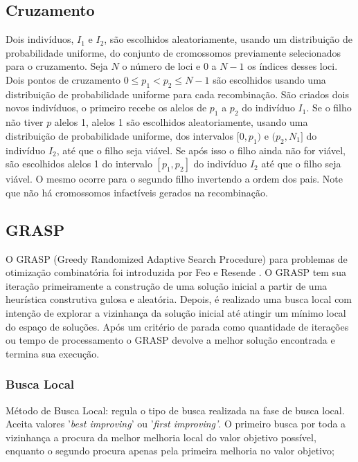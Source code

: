 \documentclass[12pt,a4paper]{article}
\begin{document}
    \subsection{Cruzamento}

        Dois indivíduos, $I_1$ e $I_2$, são escolhidos aleatoriamente, usando um distribuição de probabilidade uniforme, do conjunto de cromossomos previamente selecionados para o cruzamento. Seja
        $N$ o número de loci e $0$ a $N-1$ os índices desses loci. Dois pontos de cruzamento $0 \le p_1 < p_2 \le N-1$ são escolhidos usando uma distribuição de probabilidade uniforme para cada
        recombinação. São criados dois novos indivíduos, o primeiro recebe os alelos de $p_1$ a $p_2$ do indivíduo $I_1$. Se o filho não tiver $p$ alelos 1, alelos 1 são escolhidos aleatoriamente,
        usando uma distribuição de probabilidade uniforme, dos intervalos $[0, p_1)$ e $(p_2, N_1]$ do indivíduo $I_2$, até que o filho seja viável. Se após isso o filho ainda não for viável, são
        escolhidos alelos 1 do intervalo $[p_1, p_2]$ do indivíduo $I_2$ até que o filho seja viável. O mesmo ocorre para o segundo filho invertendo a ordem dos pais. Note que não há cromossomos
        infactíveis gerados na recombinação. 

\subsection{GRASP}

    O GRASP (Greedy Randomized Adaptive Search Procedure) para problemas de otimização combinatória foi introduzida por Feo e Resende \cite{feo1989probabilistic}. O GRASP tem sua iteração
    primeiramente a construção de uma solução inicial a partir de uma heurística construtiva gulosa e aleatória. Depois, é realizado uma busca local com intenção de explorar a vizinhança da
    solução inicial até atingir um mínimo local do espaço de soluções. Após um critério de parada como quantidade de iterações ou tempo de processamento o GRASP devolve a melhor solução
    encontrada e termina sua execução.



    \subsubsection{Busca Local}

        Método de Busca Local: regula o tipo de busca realizada na fase de busca local. Aceita valores '\textit{best improving}' ou '\textit{first improving'}. O primeiro busca por toda a vizinhança
        a procura da melhor melhoria local do valor objetivo possível, enquanto o segundo procura apenas pela primeira melhoria no valor objetivo;
\end{document}
